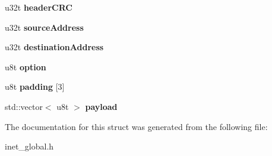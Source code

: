\begin{DoxyCompactItemize}
u32t {\bfseries header\+C\+RC}
\item 
\mbox{\label{structipv4__header__t_ade49e0bd0402fafc2f94d31277ebe6e3}} 
u32t {\bfseries source\+Address}
\item 
\mbox{\label{structipv4__header__t_a2b746f34fa839a18b548f8b950fdab61}} 
u32t {\bfseries destination\+Address}
\item 
\mbox{\label{structipv4__header__t_a86340594c0fd6d27fe9bbeeb129f31f2}} 
u8t {\bfseries option}
\item 
\mbox{\label{structipv4__header__t_a3e5bb6d694e89999c96e42576d7a052b}} 
u8t {\bfseries padding} \mbox{[}3\mbox{]}
\item 
\mbox{\label{structipv4__header__t_a6cb0f06ef984e798b7bfe4eeb11fa4d9}} 
std\+::vector$<$ u8t $>$ {\bfseries payload}
\end{DoxyCompactItemize}


The documentation for this struct was generated from the following file\+:\begin{DoxyCompactItemize}
\item 
inet\+\_\+global.\+h\end{DoxyCompactItemize}
